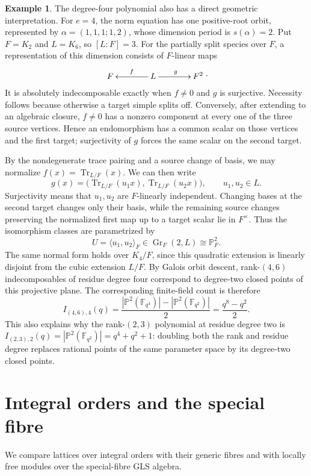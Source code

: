 \documentclass[11pt, reqno]{amsart}
\numberwithin{equation}{section}
\theoremstyle{definition}
\newtheorem{example}[theorem]{Example}
\theoremstyle{remark}
\newcommand{\op}[1]{\operatorname{#1}}
\newcommand{\mb}[1]{\mathbb{#1}}
\newcommand{\Tr}{\op{Tr}}
\newcommand{\quiverdiagram}[1]{\vcenter{\hbox{$\displaystyle #1$}}}
\begin{document}
\begin{example}
The degree-four polynomial also has a direct geometric
interpretation. For $e=4$, the norm equation has one positive-root
orbit, represented by $\alpha=(1,1,1;1,2)$, whose dimension period is
$s(\alpha)=2$. Put $F=K_2$ and $L=K_6$, so $[L:F]=3$.
For the partially split species over $F$, a representation of this
dimension consists of $F$-linear maps
\[
  \quiverdiagram{\xymatrix@C=3.8em{
     F&L\ar[l]_{f}\ar[r]^{g}&F^2
  }}.
\]
It is absolutely indecomposable exactly when $f\ne0$ and $g$ is
surjective. Necessity follows because otherwise a target simple
splits off. Conversely, after extending to an algebraic closure,
$f\ne0$ has a nonzero component at every one of the three source
vertices. Hence an endomorphism has a common scalar on those vertices
and the first target; surjectivity of $g$ forces the same scalar on the
second target.

By the nondegenerate trace pairing and a source change of basis, we
may normalize $f(x)=\Tr_{L/F}(x)$. We can then write
\[
  g(x)=\bigl(\Tr_{L/F}(u_1x),\Tr_{L/F}(u_2x)\bigr),
  \qquad u_1,u_2\in L.
\]
Surjectivity means that $u_1,u_2$ are $F$-linearly independent.
Changing bases at the second target changes only their basis, while
the remaining source changes preserving the normalized first map up
to a target scalar lie in $F^\times$. Thus the isomorphism classes
are parametrized by
\[
  U=\langle u_1,u_2\rangle_F
    \in\op{Gr}_F(2,L)\cong\mb P^2_F.
\]
The same normal form holds over $K_4/F$, since this quadratic
extension is linearly disjoint from the cubic extension $L/F$. By Galois orbit descent, rank-$(4,6)$
indecomposables of residue degree four correspond to degree-two
closed points of this projective plane. The corresponding
finite-field count is therefore
\begin{equation*}
  I_{(4,6),4}(q)
   =\frac{|\mb P^2(\mb F_{q^4})|
           -|\mb P^2(\mb F_{q^2})|}{2}
   =\frac{q^8-q^2}{2}.
\end{equation*}
This also explains why the rank-$(2,3)$ polynomial at residue degree
two is $I_{(2,3),2}(q)=|\mb P^2(\mb F_{q^2})|=q^4+q^2+1$:
doubling both the rank and residue degree replaces rational points of
the same parameter space by its degree-two closed points.
\end{example}

\section{Integral orders and the special fibre}\label{sec:orders}
We compare lattices over integral orders with their generic fibres
and with locally free modules over the special-fibre GLS algebra.
\end{document}
